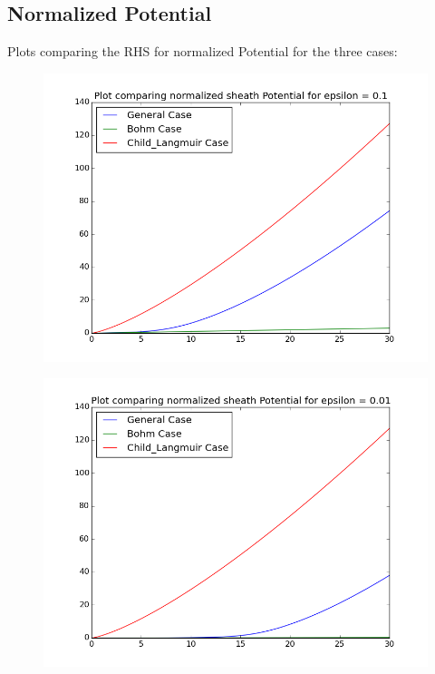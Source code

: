 \documentclass[11pt, a4paper]{article}
\begin{document}
\subsection{Normalized Potential}
Plots comparing the RHS for normalized Potential for the three cases:
\begin{figure}[H]
 \centering
 \includegraphics[width = \textwidth]{q3Veps1.png}
\end{figure}
\begin{figure}[H]
 \centering
 \includegraphics[width = \textwidth]{q3Veps2.png}
\end{figure}
\end{document}
